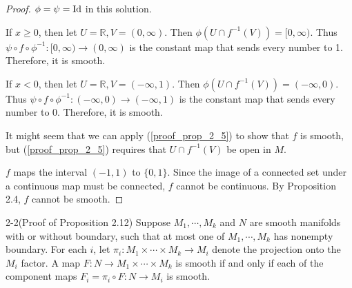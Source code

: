 \begin{proof}
  $\phi = \psi = \operatorname{Id}$ in this solution.

  If $x \geq 0$, then let $U = \mathbb{R}, V = (0, \infty)$.
  Then $\phi(U \cap f^{-1}(V)) = [0, \infty)$.
  Thus $\psi \circ f \circ \phi^{-1}: [0, \infty) \rightarrow (0, \infty)$ is the constant map that sends every number to 1.
  Therefore, it is smooth.

  If $x < 0$, then let $U = \mathbb{R}, V = (-\infty, 1)$.
  Then $\phi(U \cap f^{-1}(V)) = (-\infty, 0)$.
  Thus $\psi \circ f \circ \phi^{-1}: (-\infty, 0) \rightarrow (-\infty, 1)$ is the constant map that sends every number to 0.
  Therefore, it is smooth.

  It might seem that we can apply (\ref{proof_prop_2_5}) to show that $f$ is smooth, but (\ref{proof_prop_2_5}) requires that $U \cap f^{-1}(V)$ be open in $M$.

  $f$ maps the interval $(-1, 1)$ to $\{ 0, 1 \}$.
  Since the image of a connected set under a continuous map must be connected, $f$ cannot be continuous.
  By Proposition 2.4, $f$ cannot be smooth.
\end{proof}

\begin{customprob}{2-2(Proof of Proposition 2.12)}
  Suppose $M_1, \cdots, M_k$ and $N$ are smooth manifolds with or without boundary, such that at most one of $M_1, \cdots, M_k$ has nonempty boundary.
  For each $i$, let $\pi_i: M_1 \times \cdots \times M_k \rightarrow M_i$ denote the projection onto the $M_i$ factor.
  A map $F: N \rightarrow M_1 \times \cdots \times M_k$ is smooth if and only if each of the component maps $F_i = \pi_i \circ F: N \rightarrow M_i$ is smooth.
\end{customprob}

